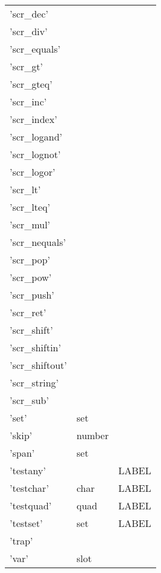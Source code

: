 \begin{center}
\begin{longtable}{lll}
'scr\_dec' &  &  \\
'scr\_div' &  &  \\
'scr\_equals' &  &  \\
'scr\_gt' &  &  \\
'scr\_gteq' &  &  \\
'scr\_inc' &  &  \\
'scr\_index' &  &  \\
'scr\_logand' &  &  \\
'scr\_lognot' &  &  \\
'scr\_logor' &  &  \\
'scr\_lt' &  &  \\
'scr\_lteq' &  &  \\
'scr\_mul' &  &  \\
'scr\_nequals' &  &  \\
'scr\_pop' &  &  \\
'scr\_pow' &  &  \\
'scr\_push' &  &  \\
'scr\_ret' &  &  \\
'scr\_shift' &  &  \\
'scr\_shiftin' &  &  \\
'scr\_shiftout' &  &  \\
'scr\_string' &  &  \\
'scr\_sub' &  &  \\
'set' & set &  \\
'skip' & number &  \\
'span' & set &  \\
'testany' &  & LABEL \\
'testchar' & char & LABEL \\
'testquad' & quad & LABEL \\
'testset' & set & LABEL \\
'trap' &  &  \\
'var' & slot &  \\
\end{longtable}
\end{center}
